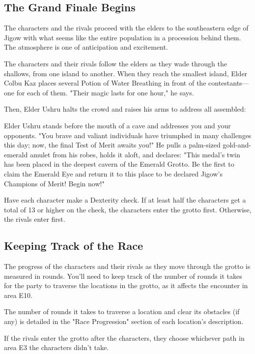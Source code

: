 \documentclass[10pt,a4paper,twoside,bg=print,twocolumn,openany,nodeprecatedcode]{dndbook}
\begin{document}
\subsection{The Grand Finale Begins}
The characters and the rivals proceed with the elders to the southeastern edge of Jigow with what seems like the entire population in a procession behind them. The atmosphere is one of anticipation and excitement.

The characters and their rivals follow the elders as they wade through the shallows, from one island to another. When they reach the smallest island, Elder Colbu Kaz places several Potion of Water Breathing in front of the contestants—one for each of them. "Their magic lasts for one hour," he says.

Then, Elder Ushru halts the crowd and raises his arms to address all assembled:

\begin{DndReadAloud}{}
Elder Ushru stands before the mouth of a cave and addresses you and your opponents. "You brave and valiant individuals have triumphed in many challenges this day; now, the final Test of Merit awaits you!" He pulls a palm-sized gold-and-emerald amulet from his robes, holds it aloft, and declares: "This medal's twin has been placed in the deepest cavern of the Emerald Grotto. Be the first to claim the Emerald Eye and return it to this place to be declared Jigow's Champions of Merit! Begin now!"

\end{DndReadAloud}

Have each character make a Dexterity check. If at least half the characters get a total of 13 or higher on the check, the characters enter the grotto first. Otherwise, the rivals enter first.

\subsection{Keeping Track of the Race}
The progress of the characters and their rivals as they move through the grotto is measured in rounds. You'll need to keep track of the number of rounds it takes for the party to traverse the locations in the grotto, as it affects the encounter in area E10.

The number of rounds it takes to traverse a location and clear its obstacles (if any) is detailed in the "Race Progression" section of each location's description.

If the rivals enter the grotto after the characters, they choose whichever path in area E3 the characters didn't take.
\end{document}
